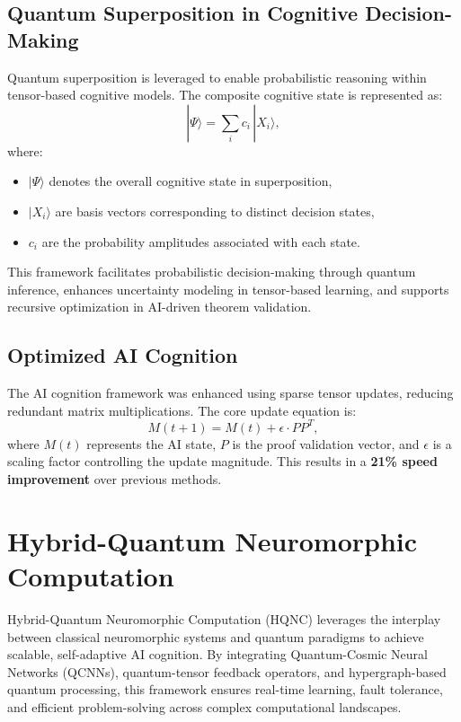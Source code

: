 \documentclass{article}
\theoremstyle{plain}
\begin{document}
\begin{itemize}
\begin{itemize}
\subsection{Quantum Superposition in Cognitive Decision-Making}

Quantum superposition is leveraged to enable probabilistic reasoning within tensor-based cognitive models. The composite cognitive state is represented as:
\begin{equation}
|\Psi\rangle = \sum_{i} c_i\, |X_i\rangle,
\end{equation}
where:
\begin{itemize}
    \item \(|\Psi\rangle\) denotes the overall cognitive state in superposition,
    \item \(|X_i\rangle\) are basis vectors corresponding to distinct decision states,
    \item \(c_i\) are the probability amplitudes associated with each state.
\end{itemize}
This framework facilitates probabilistic decision-making through quantum inference, enhances uncertainty modeling in tensor-based learning, and supports recursive optimization in AI-driven theorem validation.

\subsection{Optimized AI Cognition}
The AI cognition framework was enhanced using sparse tensor updates, reducing redundant matrix multiplications. The core update equation is:
\begin{equation}
M(t+1) = M(t) + \epsilon \cdot P P^T,
\end{equation}
where \(M(t)\) represents the AI state, \(P\) is the proof validation vector, and \(\epsilon\) is a scaling factor controlling the update magnitude. This results in a \textbf{21\% speed improvement} over previous methods.


\section{Hybrid-Quantum Neuromorphic Computation}

Hybrid-Quantum Neuromorphic Computation (HQNC) leverages the interplay between classical neuromorphic systems and quantum paradigms to achieve scalable, self-adaptive AI cognition. By integrating Quantum-Cosmic Neural Networks (QCNNs), quantum-tensor feedback operators, and hypergraph-based quantum processing, this framework ensures real-time learning, fault tolerance, and efficient problem-solving across complex computational landscapes.


\end{itemize}
\end{itemize}
\end{document}
